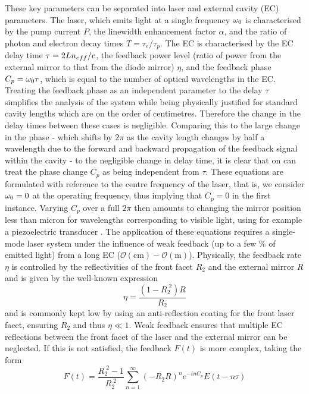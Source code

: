 %
These key parameters can be separated into laser and external cavity (EC) parameters. The laser, which emits light at a single frequency $\omega_0$ is characterised by the pump current $P$, 
the linewidth enhancement factor $\alpha$, and the ratio of photon and electron decay times $T = \tau_e/\tau_p$. 
The EC is characterised by the EC delay time $\tau = 2Ln_{eff}/c$, the feedback power level (ratio of power from the external mirror to that from the diode mirror) $\eta$, 
and the feedback phase $C_p = \omega_0 \tau$, which is equal to the number of optical wavelengths in the EC. 
Treating the feedback phase as an independent parameter to the delay $\tau$ simplifies the analysis of the system while being physically justified for standard cavity lengths which are on the order of centimetres.
Therefore the change in the delay times between these cases is negligible. 
Comparing this to the large change in the phase - which shifts by $2\pi$ as the cavity length changes by half a wavelength due to the forward and backward propagation of the feedback signal within the cavity - 
to the negligible change in delay time, it is clear that on can treat the phase change $C_p$ as being independent from $\tau$. 
These equations are formulated with reference to the centre frequency of the laser, that is, we consider $\omega_0 = 0$ at the operating frequency, thus implying that $C_p=0$ in the first instance. 
Varying $C_p$ over a full $2\pi$ then amounts to changing the mirror position less than micron for wavelengths corresponding to visible light, using for example a piezoelectric transducer \cite{heil2003delay}. 
The application of these equations requires a single-mode laser system under the influence of weak feedback (up to a few \% of emitted light) from a long EC ($\mathcal{O}(\text{cm}) - \mathcal{O}(\text{m})$). 
Physically, the feedback rate $\eta$ is controlled by the reflectivities of the front facet $R_2$ and the external mirror $R$ and is given by the well-known expression 
%
\begin{equation}
    \eta = \frac{(1-R_2^{\;2})R}{R_2}
\end{equation}
%
and is commonly kept low by using an anti-reflection coating for the front laser facet, ensuring $R_2$ and thus $\eta \ll 1$. 
Weak feedback ensures that multiple EC reflections between the front facet of the laser and the external mirror can be neglected. 
If this is not satisfied, the feedback $F(t)$ is more complex, taking the form \cite{vantartwijk1995semiconductor}
%
\begin{equation}
\label{eq:multiple_EC}
    F(t) = \frac{R_2^{\;2} - 1}{R_2^{\;2}} \sum_{n=1}^\infty (-R_2 R)^n e^{-i n C_p} E(t-n \tau)
\end{equation}
